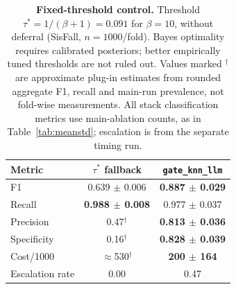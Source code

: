 \begin{table}[!t]
\centering
\caption{\textbf{Fixed-threshold control.} Threshold $\tau^\ast{=}1/(\beta{+}1){=}0.091$ for $\beta{=}10$, without deferral (SisFall, $n{=}1000$/fold). Bayes optimality requires calibrated posteriors; better empirically tuned thresholds are not ruled out. Values marked $^\dagger$ are approximate plug-in estimates from rounded aggregate F1, recall and main-run prevalence, not fold-wise measurements. All stack classification metrics use main-ablation counts, as in Table~\ref{tab:meanstd}; escalation is from the separate timing run.}
\label{tab:partitionfallback}
\begin{tabular}{lcc}
\toprule
Metric & $\tau^\ast$ fallback & \texttt{gate\_knn\_llm} \\
\midrule
F1              & 0.639 $\pm$ 0.006 & \textbf{0.887 $\pm$ 0.029} \\
Recall          & \textbf{0.988 $\pm$ 0.008} & 0.977 $\pm$ 0.037 \\
Precision       & 0.47$^\dagger$ & \textbf{0.813 $\pm$ 0.036} \\
Specificity     & 0.16$^\dagger$ & \textbf{0.828 $\pm$ 0.039} \\
Cost/1000       & $\approx$530$^\dagger$ & \textbf{200 $\pm$ 164} \\
Escalation rate & 0.00 & 0.47 \\
\bottomrule
\end{tabular}
\end{table}
